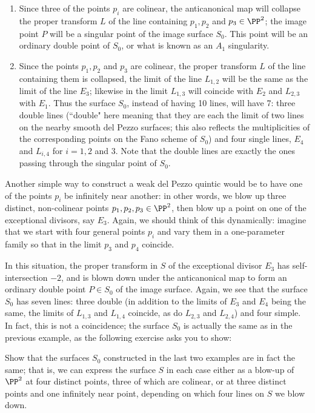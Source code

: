\begin{enumerate}

\item Since three of the points $p_i$ are colinear, the anticanonical map will collapse the proper transform $L$ of the line containing $p_1, p_2$ and $p_3 \in \PP^2$; the image point $P$ will be a singular point of the image surface $S_0$. This point will be an ordinary double point of $S_0$, or what is known as an $A_1$ singularity.

\item Since the points $p_1, p_2$ and $p_3$ are colinear, the proper transform $L$ of the line containing them is collapsed, the limit of the line $L_{1,2}$ will be the same as the limit of the line $E_3$; likewise in the limit $L_{1,3}$ will coincide with $E_2$ and $L_{2,3}$ with $E_1$. Thus the surface $S_0$, instead of having 10 lines, will have 7: three double lines (``double" here meaning that they are each the limit of two lines on the nearby smooth del Pezzo surfaces; this also reflects the multiplicities of the corresponding points on the Fano scheme of $S_0$) and four single lines, $E_4$ and $L_{i,4}$ for $i = 1, 2$ and $3$. Note that the double lines are exactly the ones passing through the singular point of $S_0$.

\end{enumerate}

Another simple way to construct a weak del Pezzo quintic would be to have one of the points $p_i$ be infinitely near another: in other words, we blow up three distinct, non-colinear points $p_1,p_2, p_3 \in \PP^2$, then blow up a point on one of the exceptional divisors, say $E_3$. Again, we should think of this dynamically: imagine that we start with four general points $p_i$ and vary them in a one-parameter family so that in the limit $p_3$ and $p_4$ coincide.

In this situation, the proper transform in $S$ of the exceptional divisor $E_3$ has self-intersection $-2$, and is blown down under the anticanonical map to form an ordinary double point $P \in S_0$ of the image surface. Again, we see that the surface $S_0$ has seven lines: three double (in addition to the limits of $E_3$ and $E_4$ being the same, the limits of $L_{1,3}$ and $L_{1,4}$ coincide, as do $L_{2,3}$ and $L_{2,4}$) and four simple. In fact, this is not a coincidence; the surface $S_0$ is actually the same as in the previous example, as the following exercise asks you to show:

\begin{exercise}
Show that the surfaces $S_0$ constructed in the last two examples are in fact the same; that is, we can express the surface $S$ in each case either as a blow-up of $\PP^2$ at four distinct points, three of which are colinear, or at three distinct points and one infinitely near point, depending on which four lines on $S$ we blow down.
\end{exercise}

